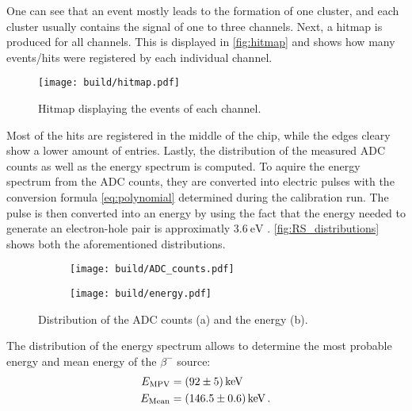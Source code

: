 One can see that an event mostly leads to the formation of one cluster,
and each cluster usually contains the signal of one to three channels.
Next, a hitmap is produced for all channels. This is displayed in
\autoref{fig:hitmap} and shows how many events/hits were registered by each
individual channel. 
\begin{figure}[H]
  \centering
  \texttt{[image: build/hitmap.pdf]}
  \caption{Hitmap displaying the events of each channel.}
  \label{fig:hitmap}
\end{figure}

Most of the hits are registered in the middle of the chip, while the
edges cleary show a lower amount of entries.
Lastly, the distribution of the measured ADC counts as well as the energy
spectrum is computed. To aquire the energy spectrum from the ADC counts, they
are converted into electric pulses with the conversion formula \eqref{eq:polynomial} determined
during the calibration run. The pulse is then converted into an energy by
using the fact that the energy needed to generate an electron-hole pair is approximatly
$\qty{3.6}{\electronvolt}$ \cite{V15}. \autoref{fig:RS_distributions} shows
both the aforementioned distributions.

\begin{figure}[H]
  \centering
    \begin{subfigure}{0.45\textwidth}
      \texttt{[image: build/ADC\_counts.pdf]}
      \caption{}
    \end{subfigure}
    \begin{subfigure}{0.45\textwidth}
      \texttt{[image: build/energy.pdf]}
      \caption{}
    \end{subfigure}
  \caption{Distribution of the ADC counts (a) and the energy (b).}
  \label{fig:RS_distributions}
\end{figure}

The distribution of the energy spectrum allows to determine the most probable energy
and mean energy of the $\beta^-$ source:
\begin{align*}
  E_{\mathrm{MPV}} &= \qty{92+-5}{\kilo\electronvolt} \\
  E_{\mathrm{Mean}} &= \qty{146.5+-0.6}{\kilo\electronvolt} \, .
\end{align*}